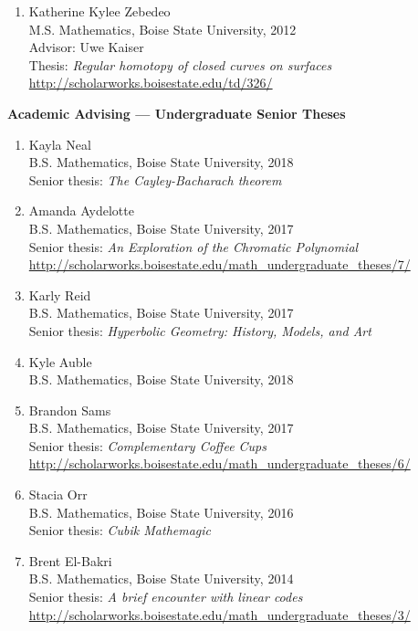 \documentclass[12pt]{article}
\begin{document}
\begin{enumerate}[revarabic]
\item Katherine Kylee Zebedeo \\
M.S. Mathematics, Boise State University, 2012 \\
Advisor: Uwe Kaiser \\
Thesis: \emph{Regular homotopy of closed curves on surfaces} \\
\url{http://scholarworks.boisestate.edu/td/326/}
\end{enumerate}



\textbf{Academic Advising --- Undergraduate Senior Theses}
\begin{enumerate}[revarabic]
\item Kayla Neal \\
B.S. Mathematics, Boise State University, 2018 \\
Senior thesis: \emph{The Cayley-Bacharach theorem}

\item Amanda Aydelotte \\
B.S. Mathematics, Boise State University, 2017 \\
Senior thesis: \emph{An Exploration of the Chromatic Polynomial} \\
\url{http://scholarworks.boisestate.edu/math_undergraduate_theses/7/}

\item Karly Reid \\
B.S. Mathematics, Boise State University, 2017 \\
Senior thesis: \emph{Hyperbolic Geometry: History, Models, and Art}

\item Kyle Auble \\
B.S. Mathematics, Boise State University, 2018

\item Brandon Sams \\
B.S. Mathematics, Boise State University, 2017 \\
Senior thesis: \emph{Complementary Coffee Cups} \\
\url{http://scholarworks.boisestate.edu/math_undergraduate_theses/6/}

\item Stacia Orr \\
B.S. Mathematics, Boise State University, 2016 \\
Senior thesis: \emph{Cubik Mathemagic}

\item Brent El-Bakri \\
B.S. Mathematics, Boise State University, 2014 \\
Senior thesis: \emph{A brief encounter with linear codes} \\
\url{http://scholarworks.boisestate.edu/math_undergraduate_theses/3/}
\end{enumerate}
\end{document}
